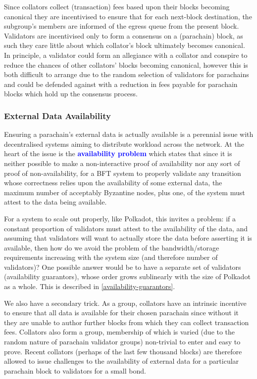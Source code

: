 \documentclass[t,usepdftitle=false]{beamer}
\renewcommand{\textit}[1]{\textcolor{blue}{\textbf{#1}}}
\begin{document}
\begin{frame}
 Since collators collect (transaction) fees based upon their blocks becoming canonical they are incentivised to ensure that for each next-block destination, the subgroup's members are informed of the egress queue from the present block. Validators are incentivised only to form a consensus on a (parachain) block, as such they care little about which collator's block ultimately becomes canonical. In principle, a validator could form an allegiance with a collator and conspire to reduce the chances of other collators' blocks becoming canonical, however this is both difficult to arrange due to the random selection of validators for parachains and could be defended against with a reduction in fees payable for parachain blocks which hold up the consensus process.

\subsubsection{External Data Availability}

 Ensuring a parachain's external data is actually available is a perennial issue with decentralised systems aiming to distribute workload across the network. At the heart of the issue is the \textit{availability problem} which states that since it is neither possible to make a non-interactive proof of availability nor any sort of proof of non-availability, for a BFT system to properly validate any transition whose correctness relies upon the availability of some external data, the maximum number of acceptably Byzantine nodes, plus one, of the system must attest to the data being available.

 For a system to scale out properly, like Polkadot, this invites a problem: if a constant proportion of validators must attest to the availability of the data, and assuming that validators will want to actually store the data before asserting it is available, then how do we avoid the problem of the bandwidth/storage requirements increasing with the system size (and therefore number of validators)? One possible answer would be to have a separate set of validators (availability guarantors), whose order grows sublinearly with the size of Polkadot as a whole. This is described in \ref{availability-guarantors}.

 We also have a secondary trick. As a group, collators have an intrinsic incentive to ensure that all data is available for their chosen parachain since without it they are unable to author further blocks from which they can collect transaction fees. Collators also form a group, membership of which is varied (due to the random nature of parachain validator groups) non-trivial to enter and easy to prove. Recent collators (perhaps of the last few thousand blocks) are therefore allowed to issue challenges to the availability of external data for a particular parachain block to validators for a small bond.


\end{frame}
\end{document}
